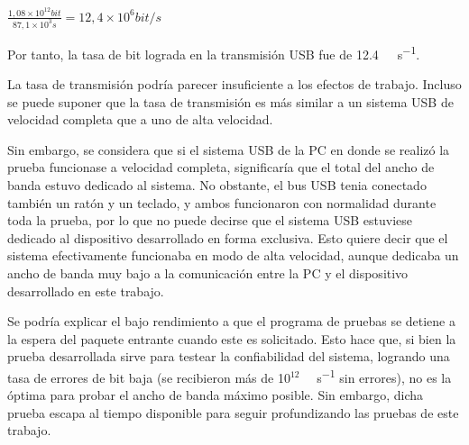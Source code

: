 \begin{center}
	\begin{math}
		\frac{\displaystyle 1,08 \times 10^{12} bit}{\displaystyle 87,1 \times 10^3 s}= 12,4 \times 10^6 bit/s
	\end{math}
\end{center}

Por tanto, la tasa de bit lograda en la transmisión USB fue de \SI{12.4}{\mega\bit\per\second}. 

La tasa de transmisión podría parecer insuficiente a los efectos de trabajo. Incluso se puede suponer que la tasa de transmisión es más similar a un sistema USB de velocidad completa que a uno de alta velocidad.

Sin embargo, se considera que si el sistema USB de la PC en donde se realizó la prueba funcionase a velocidad completa, significaría que el total del ancho de banda estuvo dedicado al sistema. No obstante, el bus USB tenia conectado también un ratón y un teclado, y ambos funcionaron con normalidad durante toda la prueba, por lo que no puede decirse que el sistema USB estuviese dedicado al dispositivo desarrollado en forma exclusiva. Esto quiere decir que el sistema efectivamente funcionaba en modo de alta velocidad, aunque dedicaba un ancho de banda muy bajo a la comunicación entre la PC y el dispositivo desarrollado en este trabajo.

Se podría explicar el bajo rendimiento a que el programa de pruebas se detiene a la espera del paquete entrante cuando este es solicitado. Esto hace que, si bien la prueba desarrollada sirve para testear la confiabilidad del sistema, logrando una tasa de errores de bit baja (se recibieron más de 10$^{12}$ \SI{}{\bit\per\second} sin errores), no es la óptima para probar el ancho de banda máximo posible. Sin embargo, dicha prueba escapa al tiempo disponible para seguir profundizando las pruebas de este trabajo.
